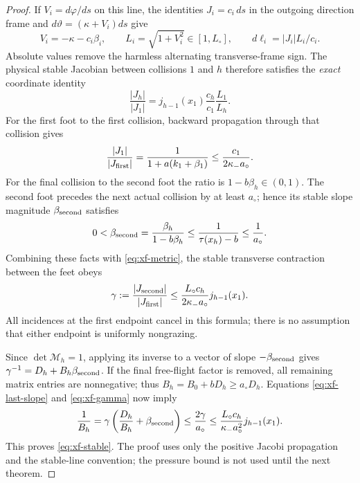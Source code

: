 \begin{proof}
If $V_i=d\varphi/ds$ on this line, the identities
$J_i=c_i\,ds$ in the outgoing direction frame and
$d\vartheta=(\kappa+V_i)ds$ give
\[
 V_i=-\kappa-c_i\beta_i,\qquad
 L_i=\sqrt{1+V_i^2}\in[1,L_\circ],\qquad
 d\ell_i=|J_i|L_i/c_i.
\]
Absolute values remove the harmless alternating transverse-frame
sign. The physical stable Jacobian between collisions $1$ and $h$
therefore satisfies the \emph{exact} coordinate identity
\begin{equation}\label{eq:xf-metric}
 \frac{|J_h|}{|J_1|}
       =j_{h-1}(x_1)\frac{c_h}{c_1}\frac{L_1}{L_h}.
\end{equation}
For the first foot to the first collision, backward propagation
through that collision gives
\[
 \frac{|J_1|}{|J_{\rm first}|}
       =\frac1{1+a(k_1+\beta_1)}
       \le\frac{c_1}{2\kappa_-a_\circ}.
\]
For the final collision to the second foot the ratio is
$1-b\beta_h\in(0,1)$. The second foot precedes the next actual
collision by at least $a_\circ$; hence its stable slope magnitude
$\beta_{\rm second}$ satisfies
\begin{equation}\label{eq:xf-last-slope}
 0<\beta_{\rm second}=\frac{\beta_h}{1-b\beta_h}
     \le\frac1{\tau(x_h)-b}\le\frac1{a_\circ}.
\end{equation}
Combining these facts with \eqref{eq:xf-metric}, the stable
transverse contraction between the feet obeys
\begin{equation}\label{eq:xf-gamma}
 \gamma:=\frac{|J_{\rm second}|}{|J_{\rm first}|}
    \le \frac{L_\circ c_h}{2\kappa_-a_\circ}
                                            j_{h-1}(x_1).
\end{equation}
All incidences at the first endpoint cancel in this formula; there
is no assumption that either endpoint is uniformly nongrazing.

Since $\det\mathcal M_h=1$, applying its inverse to a vector of
slope $-\beta_{\rm second}$ gives
$\gamma^{-1}=D_h+B_h\beta_{\rm second}$. If the final free-flight
factor is removed, all remaining matrix entries are nonnegative;
thus $B_h=B_0+bD_h\ge a_\circ D_h$. Equations
\eqref{eq:xf-last-slope} and \eqref{eq:xf-gamma} now imply
\[
 \frac1{B_h}
  =\gamma\left(\frac{D_h}{B_h}+\beta_{\rm second}\right)
  \le\frac{2\gamma}{a_\circ}
  \le\frac{L_\circ c_h}{\kappa_-a_\circ^2}j_{h-1}(x_1).
\]
This proves \eqref{eq:xf-stable}. The proof uses only the positive
Jacobi propagation and the stable-line convention; the pressure
bound is not used until the next theorem.
\end{proof}

